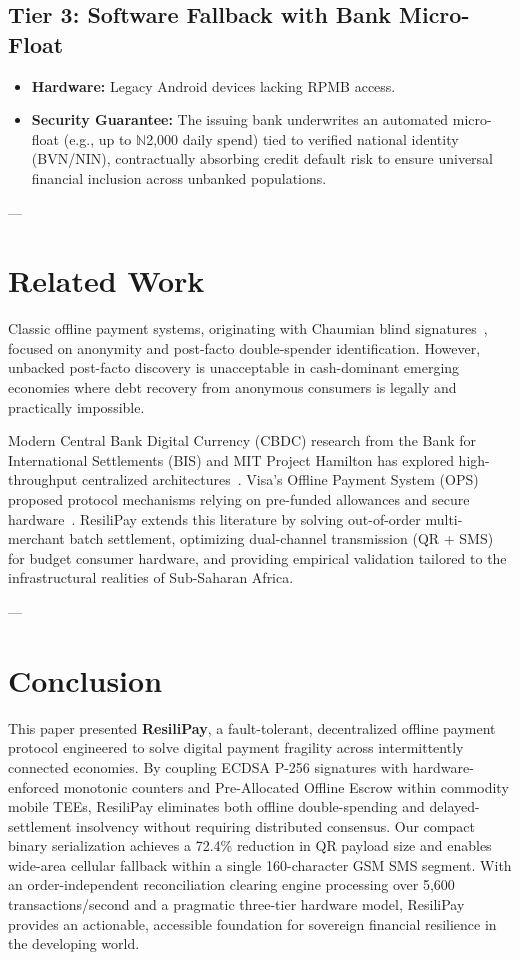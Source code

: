 \documentclass[conference]{IEEEtran}
\begin{document}
\subsection{Tier 3: Software Fallback with Bank Micro-Float}
\begin{itemize}
    \item \textbf{Hardware:} Legacy Android devices lacking RPMB access.
    \item \textbf{Security Guarantee:} The issuing bank underwrites an automated micro-float (e.g., up to $\mathbb{N}$2,000 daily spend) tied to verified national identity (BVN/NIN), contractually absorbing credit default risk to ensure universal financial inclusion across unbanked populations.
\end{itemize}

---

\section{Related Work}
Classic offline payment systems, originating with Chaumian blind signatures~\cite{chaum1983blind}, focused on anonymity and post-facto double-spender identification. However, unbacked post-facto discovery is unacceptable in cash-dominant emerging economies where debt recovery from anonymous consumers is legally and practically impossible.

Modern Central Bank Digital Currency (CBDC) research from the Bank for International Settlements (BIS) and MIT Project Hamilton has explored high-throughput centralized architectures~\cite{bis2023polaris, chu2022offline, lovejoy2023hamilton}. Visa's Offline Payment System (OPS) proposed protocol mechanisms relying on pre-funded allowances and secure hardware~\cite{christodorescu2020towards}. ResiliPay extends this literature by solving out-of-order multi-merchant batch settlement, optimizing dual-channel transmission (QR + SMS) for budget consumer hardware, and providing empirical validation tailored to the infrastructural realities of Sub-Saharan Africa.

---

\section{Conclusion}
This paper presented \textbf{ResiliPay}, a fault-tolerant, decentralized offline payment protocol engineered to solve digital payment fragility across intermittently connected economies. By coupling ECDSA P-256 signatures with hardware-enforced monotonic counters and Pre-Allocated Offline Escrow within commodity mobile TEEs, ResiliPay eliminates both offline double-spending and delayed-settlement insolvency without requiring distributed consensus. Our compact binary serialization achieves a 72.4\% reduction in QR payload size and enables wide-area cellular fallback within a single 160-character GSM SMS segment. With an order-independent reconciliation clearing engine processing over 5,600 transactions/second and a pragmatic three-tier hardware model, ResiliPay provides an actionable, accessible foundation for sovereign financial resilience in the developing world.



\end{document}
